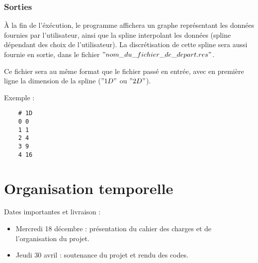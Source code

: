 \documentclass[a4paper,12pt]{article}
\begin{document}
\subsubsection{Sorties}

À la fin de l'éxécution, le programme affichera un graphe représentant les données fournies par l'utilisateur, ainsi que la spline interpolant les données (spline dépendant des choix de l'utilisateur). La discrétisation de cette spline sera aussi fournie en sortie, dans le fichier $"nom\_du\_fichier\_de\_depart.res"$.

Ce fichier sera au même format que le fichier passé en entrée, avec en première ligne la dimension de la spline ($"1D" $ ou $"2D"$).

Exemple : 

\begin{lstlisting}
    # 1D
    0 0
    1 1
    2 4
    3 9
    4 16
\end{lstlisting}

\section{Organisation temporelle}

Dates importantes et livraison :
\begin{itemize}
\item Mercredi 18 décembre : présentation du cahier des charges et de l'organisation du projet.
\item Jeudi 30 avril : soutenance du projet et rendu des codes.
\end{itemize}
\end{document}
